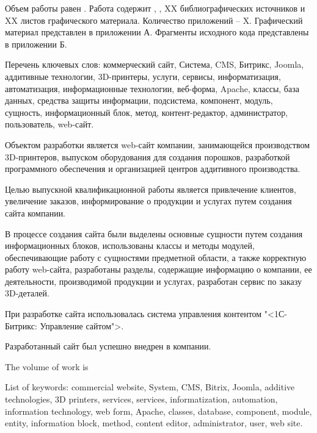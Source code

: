 
Объем работы равен . Работа содержит , , XX библиографических источников и XX листов графического материала. Количество приложений – X. Графический материал представлен в приложении А. Фрагменты исходного кода представлены в приложении Б.

Перечень ключевых слов: коммерческий сайт, Система, CMS, Битрикс, Joomla, аддитивные технологии, 3D-принтеры, услуги, сервисы, информатизация, автоматизация, информационные технологии, веб-форма,  Apache, классы, база данных, средства защиты информации, подсистема, компонент, модуль, сущность, информационный блок, метод, контент-редактор, администратор, пользователь, web-сайт.

Объектом разработки является web-сайт компании,  занимающейся \linebreak производством 3D-принтеров, выпуском оборудования для создания порошков, разработкой программного обеспечения и организацией центров аддитивного производства.

Целью выпускной квалификационной работы является \linebreak привлечение клиентов, увеличение заказов, информирование о продукции и услугах путем создания сайта компании.

В процессе создания сайта были выделены основные сущности путем создания информационных блоков, использованы классы и методы модулей, обеспечивающие работу с сущностями предметной области, а также корректную работу web-сайта, разработаны разделы, содержащие информацию о компании, ее деятельности, производимой продукции и услугах, разработан сервис по заказу 3D-деталей.

При разработке сайта использовалась система управления контентом "<1С-Битрикс: Управление сайтом">.

Разработанный сайт был успешно внедрен в компании.
\newpage
{}
  
The volume of work is %

List of keywords: commercial website, System, CMS, Bitrix, Joomla, additive technologies, 3D printers, services, services, informatization, automation, information technology, web form, Apache, classes, database, component, module, entity, information block, method, content editor, administrator, user, web site.

